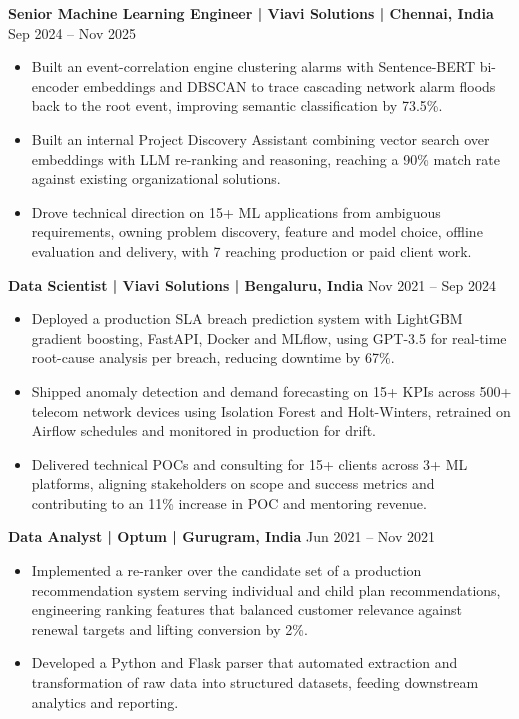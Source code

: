 \documentclass[10pt,a4paper]{article}
\newcommand{\role}[2]{\textbf{#1} \hfill #2\par}
\begin{document}
\role{Senior Machine Learning Engineer | Viavi Solutions | Chennai, India}{Sep 2024 -- Nov 2025}
\begin{itemize}
  \item Built an event-correlation engine clustering alarms with Sentence-BERT bi-encoder embeddings and DBSCAN to
  trace cascading network alarm floods back to the root event, improving semantic classification by 73.5\%.
  \item Built an internal Project Discovery Assistant combining vector search over embeddings with LLM re-ranking
  and reasoning, reaching a 90\% match rate against existing organizational solutions.
  \item Drove technical direction on 15+ ML applications from ambiguous requirements, owning problem discovery,
  feature and model choice, offline evaluation and delivery, with 7 reaching production or paid client work.
\end{itemize}
\vspace{3pt}

\role{Data Scientist | Viavi Solutions | Bengaluru, India}{Nov 2021 -- Sep 2024}
\begin{itemize}
  \item Deployed a production SLA breach prediction system with LightGBM gradient boosting, FastAPI, Docker and
  MLflow, using GPT-3.5 for real-time root-cause analysis per breach, reducing downtime by 67\%.
  \item Shipped anomaly detection and demand forecasting on 15+ KPIs across 500+ telecom network devices using
  Isolation Forest and Holt-Winters, retrained on Airflow schedules and monitored in production for drift.
  \item Delivered technical POCs and consulting for 15+ clients across 3+ ML platforms, aligning stakeholders on
  scope and success metrics and contributing to an 11\% increase in POC and mentoring revenue.
\end{itemize}
\vspace{3pt}

\role{Data Analyst | Optum | Gurugram, India}{Jun 2021 -- Nov 2021}
\begin{itemize}
  \item Implemented a re-ranker over the candidate set of a production recommendation system serving individual and
  child plan recommendations, engineering ranking features that balanced customer relevance against renewal targets
  and lifting conversion by 2\%.
  \item Developed a Python and Flask parser that automated extraction and transformation of raw data into structured
  datasets, feeding downstream analytics and reporting.
\end{itemize}
\vspace{3pt}
\end{document}
